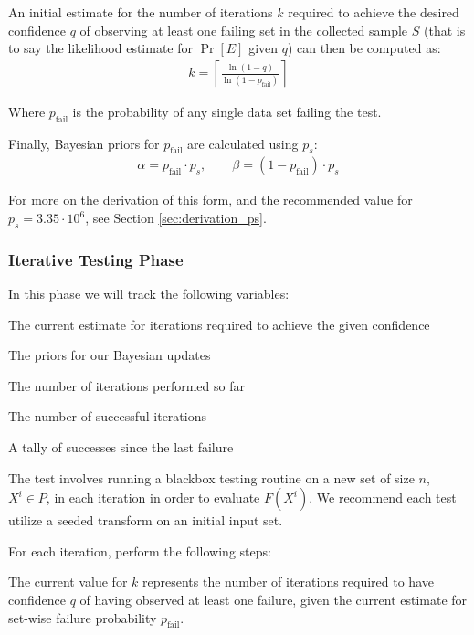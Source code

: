 An initial estimate for the number of iterations $k$ required to achieve the desired confidence $q$ of observing at least one failing set in the collected sample $S$ (that is to say the likelihood estimate for $\Pr[E]$ given $q$) can then be computed as:
\begin{align}
    k = \left\lceil \frac{\ln(1 - q)}{\ln(1 - p_{\text{fail}})} \right\rceil
\end{align}

Where $p_{\text{fail}}$ is the probability of any single data set failing the test.

Finally, Bayesian priors for $p_{\text{fail}}$ are calculated using $p_s$:
\begin{align}
    \alpha = p_{\text{fail}} \cdot p_s, \qquad
    \beta = (1 - p_{\text{fail}}) \cdot p_s
\end{align}

For more on the derivation of this form, and the recommended value for $p_s = 3.35 \cdot 10^{6}$, see Section \ref{sec:derivation_ps}.

\subsubsection{Iterative Testing Phase}

In this phase we will track the following variables:
\begin{description}[labelwidth=2em, leftmargin=!]
    \item[$k$] The current estimate for iterations required to achieve the given confidence
    \item[$\alpha, \beta$] The priors for our Bayesian updates
    \item[$iterations$] The number of iterations performed so far
    \item[$passes$] The number of successful iterations
    \item[$passes\_since\_failure$] A tally of successes since the last failure
\end{description}

The test involves running a blackbox testing routine on a new set of size $n$, $X^{i} \in P$, in each iteration in order to evaluate $F(X^{i})$. We recommend each test utilize a seeded transform on an initial input set.

For each iteration, perform the following steps:


The current value for $k$ represents the number of iterations required to have confidence $q$ of having observed at least one failure, given the current estimate for set-wise failure probability $p_{\text{fail}}$. 

